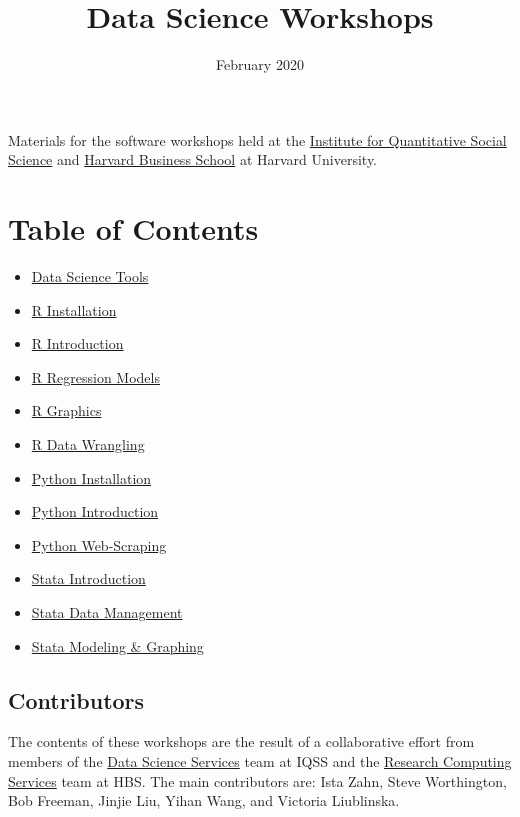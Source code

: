\documentclass[]{book}
\title{Data Science Workshops}
\author{}
\date{\vspace{-2.5em}February 2020}
\providecommand{\tightlist}{%
  \setlength{\itemsep}{0pt}\setlength{\parskip}{0pt}}
\begin{document}
\maketitle

{
\setcounter{tocdepth}{1}
\tableofcontents
}
Materials for the software workshops held at the
\href{http://dss.iq.harvard.edu/}{Institute for Quantitative Social
Science} and \href{https://training.rcs.hbs.org}{Harvard Business
School} at Harvard University.

\chapter*{Table of Contents}\label{table-of-contents}

\begin{itemize}
\tightlist
\item
  \href{./DataScienceTools.html}{Data Science Tools}
\item
  \href{./Rinstall.html}{R Installation}
\item
  \href{./Rintro.html}{R Introduction}
\item
  \href{./Rmodels.html}{R Regression Models}
\item
  \href{./Rgraphics.html}{R Graphics}
\item
  \href{./RDataWrangling.html}{R Data Wrangling}
\item
  \href{./PythonInstall.html}{Python Installation}
\item
  \href{./PythonIntro.html}{Python Introduction}
\item
  \href{./PythonWebScrape.html}{Python Web-Scraping}
\item
  \href{./StataIntro.html}{Stata Introduction}
\item
  \href{./StataDatMan.html}{Stata Data Management}
\item
  \href{./StataModGraph.html}{Stata Modeling \& Graphing}
\end{itemize}

\section*{Contributors}\label{contributors}

The contents of these workshops are the result of a collaborative effort
from members of the \href{http://dss.iq.harvard.edu}{Data Science
Services} team at IQSS and the
\href{https://training.rcs.hbs.org}{Research Computing Services} team at
HBS. The main contributors are: Ista Zahn, Steve Worthington, Bob
Freeman, Jinjie Liu, Yihan Wang, and Victoria Liublinska.
\end{document}
